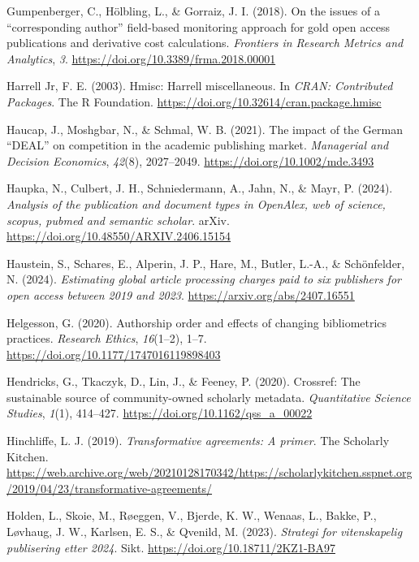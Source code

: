 \documentclass[a4paper,man,floatsintext,longtable,noextraspace,10pt]{apa6}
\newlength{\cslhangindent}
\newenvironment{CSLReferences}[2] %
{\begin{list}{}{%
  \setlength{\itemindent}{0pt}
  \setlength{\leftmargin}{0pt}
  \setlength{\parsep}{0pt}
  \ifodd #1
  \setlength{\leftmargin}{\cslhangindent}
  \setlength{\itemindent}{-1\cslhangindent}
  \fi
  \setlength{\itemsep}{#2\baselineskip}}}
{\end{list}}
\begin{document}
\begin{CSLReferences}{1}{0}
Gumpenberger, C., Hölbling, L., \& Gorraiz, J. I. (2018). On the issues
of a {``corresponding author''} field-based monitoring approach for gold
open access publications and derivative cost calculations.
\emph{Frontiers in Research Metrics and Analytics}, \emph{3}.
\url{https://doi.org/10.3389/frma.2018.00001}

Harrell Jr, F. E. (2003). Hmisc: Harrell miscellaneous. In \emph{CRAN:
Contributed Packages}. The R Foundation.
\url{https://doi.org/10.32614/cran.package.hmisc}

Haucap, J., Moshgbar, N., \& Schmal, W. B. (2021). The impact of the
{German {``DEAL''}} on competition in the academic publishing market.
\emph{Managerial and Decision Economics}, \emph{42}(8), 2027--2049.
\url{https://doi.org/10.1002/mde.3493}

Haupka, N., Culbert, J. H., Schniedermann, A., Jahn, N., \& Mayr, P.
(2024). \emph{Analysis of the publication and document types in
OpenAlex, web of science, scopus, pubmed and semantic scholar}. arXiv.
\url{https://doi.org/10.48550/ARXIV.2406.15154}

Haustein, S., Schares, E., Alperin, J. P., Hare, M., Butler, L.-A., \&
Schönfelder, N. (2024). \emph{Estimating global article processing
charges paid to six publishers for open access between 2019 and 2023}.
\url{https://arxiv.org/abs/2407.16551}

Helgesson, G. (2020). Authorship order and effects of changing
bibliometrics practices. \emph{Research Ethics}, \emph{16}(1--2), 1--7.
\url{https://doi.org/10.1177/1747016119898403}

Hendricks, G., Tkaczyk, D., Lin, J., \& Feeney, P. (2020). Crossref: The
sustainable source of community-owned scholarly metadata.
\emph{Quantitative Science Studies}, \emph{1}(1), 414--427.
\url{https://doi.org/10.1162/qss_a_00022}

Hinchliffe, L. J. (2019). \emph{Transformative agreements: A primer}.
The Scholarly Kitchen.
\url{https://web.archive.org/web/20210128170342/https://scholarlykitchen.sspnet.org/2019/04/23/transformative-agreements/}

Holden, L., Skoie, M., Røeggen, V., Bjerde, K. W., Wenaas, L., Bakke,
P., Løvhaug, J. W., Karlsen, E. S., \& Qvenild, M. (2023).
\emph{Strategi for vitenskapelig publisering etter 2024}. Sikt.
\url{https://doi.org/10.18711/2KZ1-BA97}


\end{CSLReferences}
\end{document}
